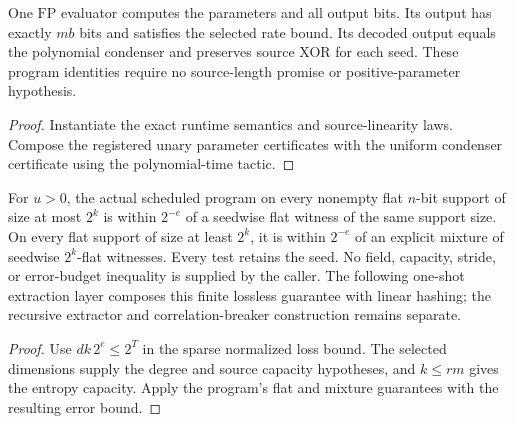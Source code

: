 \begin{theorem}
  \label{thm:lowerbounds-algebraic-explicit-condenser-program}
  \leanok
  One $\mathrm{FP}$ evaluator computes the parameters and all output bits.
  Its output has exactly $mb$ bits and satisfies the selected rate bound.
  Its decoded output equals the polynomial condenser and preserves source
  XOR for each seed. These program identities require no source-length
  promise or positive-parameter hypothesis.
\end{theorem}
\begin{proof}
  \leanok
  Instantiate the exact runtime semantics and source-linearity laws.
  Compose the registered unary parameter certificates with the uniform
  condenser certificate using the polynomial-time tactic.
\end{proof}

\begin{theorem}
  \label{thm:lowerbounds-algebraic-explicit-condenser-lossless}
  \leanok
  For $u>0$, the actual scheduled program on every nonempty flat
  $n$-bit support of size at most $2^k$ is within $2^{-e}$ of a
  seedwise flat witness of the same support size. On every flat
  support of size at least $2^k$, it is within $2^{-e}$ of an explicit
  mixture of seedwise $2^k$-flat witnesses. Every test retains the seed.
  No field, capacity, stride, or error-budget inequality is supplied by
  the caller. The following one-shot extraction layer composes this
  finite lossless guarantee with linear hashing; the recursive extractor
  and correlation-breaker construction remains separate.
\end{theorem}
\begin{proof}
  \leanok
  Use $dk\,2^e\le2^T$ in the sparse normalized loss bound. The selected
  dimensions supply the degree and source capacity hypotheses, and
  $k\le rm$ gives the entropy capacity. Apply the program's flat and
  mixture guarantees with the resulting error bound.
\end{proof}

